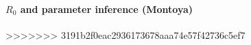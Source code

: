 \documentclass{imammb}
\numberwithin{equation}{section}
\begin{document}
		\paragraph{$R_0$ and parameter inference (Montoya)}
>>>>>>> 3191b2f0eac2936173678aaa74e57f42736c5ef7


    
%     
%     
\end{document}
